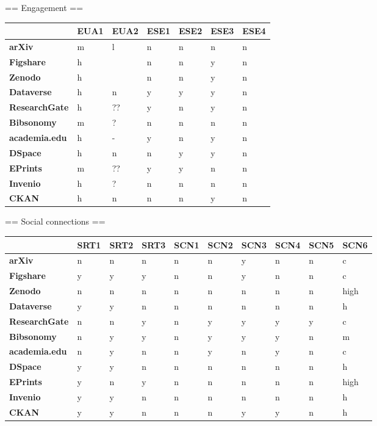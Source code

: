 == Engagement ==

\begin{tabular}{|m{2.1cm}|m{0.8cm}|m{0.8cm}|m{0.8cm}|m{0.8cm}|m{0.8cm}|m{0.8cm}|} \hline 
 & \textbf{EUA1}  & \textbf{EUA2}  & \textbf{ESE1}  & \textbf{ESE2}  & \textbf{ESE3}  & \textbf{ESE4}  \\ \hline 
\textbf{arXiv}  &m &l &n &n &n &n \\ \hline 
\textbf{Figshare}  &h & &n &n &y &n \\ \hline 
\textbf{Zenodo}  &h & &n &n &y &n \\ \hline 
\textbf{Dataverse}  &h &n &y &y &y &n \\ \hline 
\textbf{ResearchGate}  &h &?? &y &n &y &n \\ \hline 
\textbf{Bibsonomy}  &m &? &n &n &n &n \\ \hline 
\textbf{academia.edu}  &h &- &y &n &y &n \\ \hline 
 \hline 
\textbf{DSpace}  &h &n &n &y &y &n \\ \hline 
\textbf{EPrints}  &m &?? &y &y &n &n \\ \hline 
\textbf{Invenio}  &h &? &n &n &n &n \\ \hline 
\textbf{CKAN}  &h &n &n &n &y &n \\ \hline 
 \end{tabular}


== Social connections ==

\begin{tabular}{|m{2.1cm}|m{0.8cm}|m{0.8cm}|m{0.8cm}|m{0.8cm}|m{0.8cm}|m{0.8cm}|m{0.8cm}|m{0.8cm}|m{0.8cm}|} \hline 
 & \textbf{SRT1}  & \textbf{SRT2}  & \textbf{SRT3}  & \textbf{SCN1}  & \textbf{SCN2}  & \textbf{SCN3}  & \textbf{SCN4}  & \textbf{SCN5}  & \textbf{SCN6}  \\ \hline 
\textbf{arXiv}  &n &n &n &n &n &y &n &n &c \\ \hline 
\textbf{Figshare}  &y &y &y &n &n &y &n &n &c \\ \hline 
\textbf{Zenodo}  &n &n &n &n &n &n &n &n &high \\ \hline 
\textbf{Dataverse}  &y &y &n &n &n &n &n &n &h \\ \hline 
\textbf{ResearchGate}  &n &n &y &n &y &y &y &y &c \\ \hline 
\textbf{Bibsonomy}  &n &y &y &n &y &y &y &n &m \\ \hline 
\textbf{academia.edu}  &n &y &n &n &y &n &y &n &c \\ \hline 
 \hline 
\textbf{DSpace}  &y &y &n &n &n &n &n &n &h \\ \hline 
\textbf{EPrints}  &y &n &y &n &n &n &n &n &high \\ \hline 
\textbf{Invenio}  &y &y &n &n &n &n &n &n &h \\ \hline 
\textbf{CKAN}  &y &y &n &n &n &y &y &n &h \\ \hline 
 \end{tabular}


